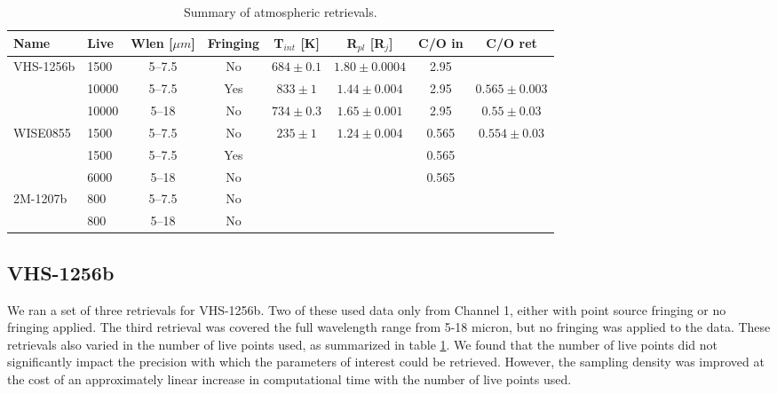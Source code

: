 \begin{table}[t]
	\begin{scriptsize}
	\begin{tabular}{l|lcccccc}
		\toprule
		\textbf{Name} & \textbf{Live} & \textbf{Wlen [$\mu m$]} & \textbf{Fringing} & \textbf{T$_{int}$ [K]} & \textbf{R$_{pl}$ [R$_{j}$]} & \textbf{C/O in} & \textbf{C/O ret}\\
		\midrule
		\multirow{3}{*}{VHS-1256b} & 1500 & 5--7.5  & No  & $684\pm0.1$ & $1.80\pm0.0004$ & 2.95 &\\
		                           & 10000 & 5--7.5 & Yes & $833\pm1$   & $1.44\pm0.004$ & 2.95 &$0.565\pm0.003$\\
		                           & 10000 & 5--18  & No  & $734\pm0.3$ & $1.65\pm0.001$ & 2.95 & $0.55\pm0.03$\\
		                           \midrule
		\multirow{3}{*}{WISE0855}  & 1500 & 5--7.5  & No  & $235\pm1$ & $1.24\pm0.004$ &0.565& $0.554\pm0.03$\\
								   & 1500 & 5--7.5  & Yes &  &  & 0.565 &\\
							       & 6000 & 5--18   & No  &  &  & 0.565 &\\
							       \midrule
		\multirow{2}{*}{2M-1207b}  & 800 & 5--7.5   & No  &  &  &  &\\
								   & 800 & 5--18    & No  &  &  &  &\\
		\bottomrule
	\end{tabular}
	\caption{Summary of atmospheric retrievals.}
	\label{tab:atmosum}
	\end{scriptsize}
\end{table}

\subsection{VHS-1256b}
We ran a set of three retrievals for VHS-1256b.
Two of these used data only from Channel 1, either with point source fringing or no fringing applied.
The third retrieval was covered the full wavelength range from 5-18 micron, but no fringing was applied to the data.
These retrievals also varied in the number of live points used, as summarized in table \ref{tab:atmosum}.
We found that the number of live points did not significantly impact the precision with which the parameters of interest could be retrieved.
However, the sampling density was improved at the cost of an approximately linear increase in computational time with the number of live points used.

